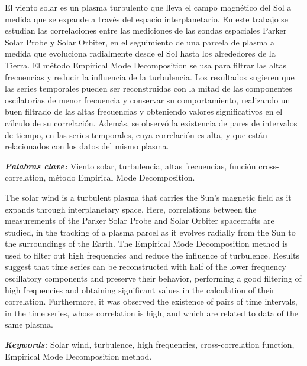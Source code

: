     \begin{resumen}
                    
        El viento solar es un plasma turbulento que lleva el campo magnético del Sol a medida que se expande a través del espacio interplanetario. En este trabajo se estudian las correlaciones entre las mediciones de las sondas espaciales Parker Solar Probe y Solar Orbiter, en el seguimiento de una parcela de plasma a medida que evoluciona radialmente desde el Sol hasta los alrededores de la Tierra. El método Empirical Mode Decomposition se usa para filtrar las altas frecuencias y reducir la influencia de la turbulencia. Los resultados sugieren que las series temporales pueden ser reconstruidas con la mitad de las componentes oscilatorias de menor frecuencia y conservar su comportamiento, realizando un buen filtrado de las altas frecuencias y obteniendo valores significativos en el cálculo de su correlación. Además, se observó la existencia de pares de intervalos de tiempo, en las series temporales, cuya correlación es alta, y que están relacionados con los datos del mismo plasma.  
        
    \vspace{0.3cm}\noindent\textbf{\textit{Palabras clave:}} Viento solar, turbulencia, altas frecuencias, función cross-correlation, método Empirical Mode Decomposition. 
    
    \end{resumen}
    
    \begin{resumenEng}
    
        The solar wind is a turbulent plasma that carries the Sun's magnetic field as it expands through interplanetary space. Here, correlations between the measurements of the Parker Solar Probe and Solar Orbiter spacecrafts are studied, in the tracking of a plasma parcel as it evolves radially from the Sun to the surroundings of the Earth. The Empirical Mode Decomposition method is used to filter out high frequencies and reduce the influence of turbulence. Results suggest that time series can be reconstructed with half of the lower frequency oscillatory components and preserve their behavior, performing a good filtering of high frequencies and obtaining significant values in the calculation of their correlation. Furthermore, it was observed the existence of pairs of time intervals, in the time series, whose correlation is high, and which are related to data of the same plasma.
        
    \vspace{0.3cm}\noindent\textbf{\textit{Keywords:}} Solar wind, turbulence, high frequencies, cross-correlation function, Empirical Mode Decomposition method.  
    \end{resumenEng}